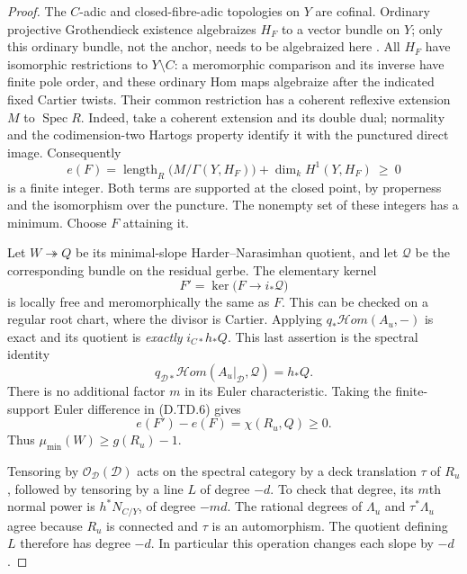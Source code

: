 \begin{proof}
The $C$-adic and closed-fibre-adic topologies on $Y$ are cofinal.
Ordinary projective Grothendieck existence algebraizes $H_F$ to
a vector bundle on $Y$; only this ordinary bundle, not the anchor,
needs to be algebraized here
\citep[Theorem 30.27.1, Tag 088E]{StacksTwistedDepthD}.
All $H_F$ have isomorphic restrictions to $Y\setminus C$:
a meromorphic comparison and its inverse have finite pole order,
and these ordinary Hom maps algebraize after the indicated fixed
Cartier twists. Their common restriction has a coherent reflexive
extension $M$ to $\operatorname{Spec}R$. Indeed, take a coherent
extension and its double dual; normality and the codimension-two
Hartogs property identify it with the punctured direct image.
Consequently
\[
 e(F)=\operatorname{length}_R\bigl(M/\Gamma(Y,H_F)\bigr)
                      +\dim_k H^1(Y,H_F)\ \geq\ 0             \tag{D.TD.6}
\]
is a finite integer. Both terms are supported at the closed point,
by properness and the isomorphism over the puncture. The nonempty
set of these integers has a minimum. Choose $F$ attaining it.

Let $W\twoheadrightarrow Q$ be its minimal-slope
Harder--Narasimhan quotient, and let $\mathcal Q$ be the
corresponding bundle on the residual gerbe. The elementary kernel
\[
           F'=\ker\bigl(F\longrightarrow i_*\mathcal Q\bigr)
                                                               \tag{D.TD.7}
\]
is locally free and meromorphically the same as $F$. This can be
checked on a regular root chart, where the divisor is Cartier.
Applying $q_*\mathcal Hom(A_u,-)$ is exact and its quotient is
\emph{exactly} $i_{C*}h_*Q$. This last assertion is the spectral
identity
\[
 q_{\mathcal D*}\mathcal Hom(A_u|_{\mathcal D},\mathcal Q)
                            =h_*Q.                            \tag{D.TD.8}
\]
There is no additional factor $m$ in its Euler characteristic.
Taking the finite-support Euler difference in (D.TD.6) gives
\[
                   e(F')-e(F)=\chi(R_u,Q)\geq0.
                                                               \tag{D.TD.9}
\]
Thus $\mu_{\min}(W)\geq g(R_u)-1$.

Tensoring by $\mathcal O_{\mathcal D}(\mathcal D)$ acts on the
spectral category by a deck translation $\tau$ of $R_u$, followed
by tensoring by a line $L$ of degree $-d$. To check that degree,
its $m$th normal power is $h^*N_{C/Y}$, of degree $-md$.
The rational degrees of $\Lambda_u$ and $\tau^*\Lambda_u$ agree
because $R_u$ is connected and $\tau$ is an automorphism.
The quotient defining $L$ therefore has degree $-d$.
In particular this operation changes each slope by $-d$.


\end{proof}

